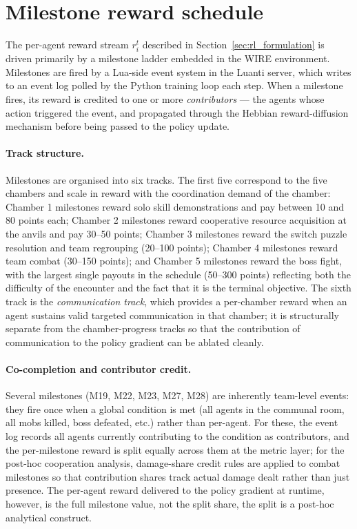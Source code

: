 \section{Milestone reward schedule}
\label{sec:milestone_table}

The per-agent reward stream $r_i^t$ described in Section~\ref{sec:rl_formulation} is driven primarily by a milestone ladder embedded in the WIRE environment. Milestones are fired by a Lua-side event system in the Luanti server, which writes to an event log polled by the Python training loop each step. When a milestone fires, its reward is credited to one or more \emph{contributors} --- the agents whose action triggered the event, and propagated through the Hebbian reward-diffusion mechanism before being passed to the policy update.

\paragraph{Track structure.}
Milestones are organised into six tracks. The first five correspond to the five chambers and scale in reward with the coordination demand of the chamber: Chamber 1 milestones reward solo skill demonstrations and pay between 10 and 80 points each; Chamber 2 milestones reward cooperative resource acquisition at the anvils and pay 30--50 points; Chamber 3 milestones reward the switch puzzle resolution and team regrouping (20--100 points); Chamber 4 milestones reward team combat (30--150 points); and Chamber 5 milestones reward the boss fight, with the largest single payouts in the schedule (50--300 points) reflecting both the difficulty of the encounter and the fact that it is the terminal objective. The sixth track is the \emph{communication track}, which provides a per-chamber reward when an agent sustains valid targeted communication in that chamber; it is structurally separate from the chamber-progress tracks so that the contribution of communication to the policy gradient can be ablated cleanly.

\paragraph{Co-completion and contributor credit.}
Several milestones (M19, M22, M23, M27, M28) are inherently team-level events: they fire once when a global condition is met (all agents in the communal room, all mobs killed, boss defeated, etc.) rather than per-agent. For these, the event log records all agents currently contributing to the condition as contributors, and the per-milestone reward is split equally across them at the metric layer; for the post-hoc cooperation analysis, damage-share credit rules are applied to combat milestones so that contribution shares track actual damage dealt rather than just presence. The per-agent reward delivered to the policy gradient at runtime, however, is the full milestone value, not the split share, the split is a post-hoc analytical construct.

